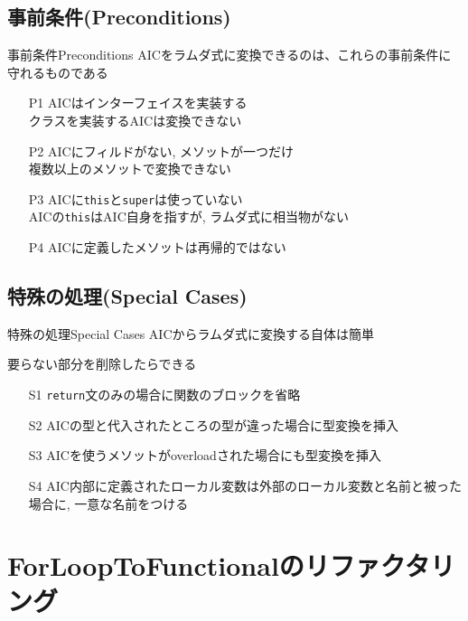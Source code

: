 \subsection{事前条件(Preconditions)}
\begin{frame}{事前条件}{Preconditions}
AICをラムダ式に変換できるのは、これらの事前条件に守れるものである
\begin{itemize}
  \item[P1] AICはインターフェイスを実装する\\
            クラスを実装するAICは変換できない
  \item[P2] AICにフィルドがない, メソットが一つだけ\\
            複数以上のメソットで変換できない
  \item[P3] AICに\texttt{this}と\texttt{super}は使っていない\\
            AICの\texttt{this}はAIC自身を指すが, ラムダ式に相当物がない
  \item[P4] AICに定義したメソットは再帰的ではない　
\end{itemize}
\end{frame}
\subsection{特殊の処理(Special Cases)}
\begin{frame}{特殊の処理}{Special Cases}
AICからラムダ式に変換する自体は簡単

要らない部分を削除したらできる

\begin{itemize}
  \item[S1] \texttt{return}文のみの場合に関数のブロックを省略
  \item[S2] AICの型と代入されたところの型が違った場合に型変換を挿入
  \item[S3] AICを使うメソットがoverloadされた場合にも型変換を挿入
  \item[S4] AIC内部に定義されたローカル変数は外部のローカル変数と名前と被った場合に, 一意な名前をつける
\end{itemize}

\end{frame}
\section{ForLoopToFunctionalのリファクタリング}
